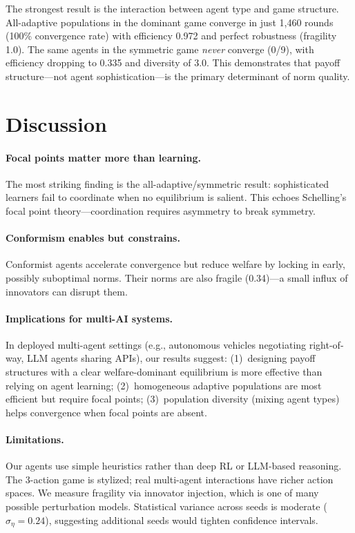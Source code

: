 \documentclass[11pt]{article}
\begin{document}
The strongest result is the interaction between agent type and game structure.
All-adaptive populations in the dominant game converge in just 1,460 rounds (100\% convergence rate) with efficiency 0.972 and perfect robustness (fragility 1.0).
The same agents in the symmetric game \emph{never} converge (0/9), with efficiency dropping to 0.335 and diversity of 3.0.
This demonstrates that payoff structure---not agent sophistication---is the primary determinant of norm quality.

\section{Discussion}

\paragraph{Focal points matter more than learning.}
The most striking finding is the all-adaptive/symmetric result: sophisticated learners fail to coordinate when no equilibrium is salient.
This echoes Schelling's~\cite{schelling1960strategy} focal point theory---coordination requires asymmetry to break symmetry.

\paragraph{Conformism enables but constrains.}
Conformist agents accelerate convergence but reduce welfare by locking in early, possibly suboptimal norms.
Their norms are also fragile (0.34)---a small influx of innovators can disrupt them.

\paragraph{Implications for multi-AI systems.}
In deployed multi-agent settings (e.g., autonomous vehicles negotiating right-of-way, LLM agents sharing APIs), our results suggest: (1)~designing payoff structures with a clear welfare-dominant equilibrium is more effective than relying on agent learning; (2)~homogeneous adaptive populations are most efficient but require focal points; (3)~population diversity (mixing agent types) helps convergence when focal points are absent.

\paragraph{Limitations.}
Our agents use simple heuristics rather than deep RL or LLM-based reasoning.
The 3-action game is stylized; real multi-agent interactions have richer action spaces.
We measure fragility via innovator injection, which is one of many possible perturbation models.
Statistical variance across seeds is moderate ($\sigma_\eta = 0.24$), suggesting additional seeds would tighten confidence intervals.
\end{document}

